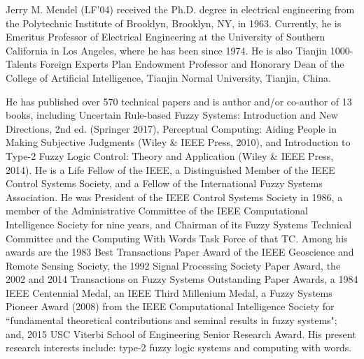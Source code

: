 \documentclass[journal,twocolumn]{IEEEtran}
\begin{document}
\begin{IEEEbiography}{Jerry M. Mendel} (LF'04) received the Ph.D. degree in electrical engineering from the Polytechnic Institute of Brooklyn, Brooklyn, NY, in 1963. Currently, he is Emeritus Professor of Electrical Engineering at the University of Southern California in Los Angeles,  where he has been since 1974. He is also Tianjin 1000-Talents Foreign Experts Plan Endowment Professor and Honorary Dean of the College of Artificial Intelligence, Tianjin Normal University, Tianjin, China.

He has published over 570 technical papers and is author and/or co-author of 13 books, including Uncertain Rule-based Fuzzy Systems: Introduction and New Directions, 2nd ed. (Springer 2017), Perceptual Computing: Aiding People in Making Subjective Judgments (Wiley \& IEEE Press, 2010), and Introduction to Type-2 Fuzzy Logic Control: Theory and Application (Wiley \& IEEE Press, 2014). He is a Life Fellow of the IEEE, a Distinguished Member of the IEEE Control Systems Society, and a Fellow of the International Fuzzy Systems Association. He was President of the IEEE Control Systems Society in 1986, a member of the Administrative Committee of the IEEE Computational Intelligence Society for nine years, and Chairman of its Fuzzy Systems Technical Committee and the Computing With Words Task Force of that TC. Among his awards are the 1983 Best Transactions Paper Award of the IEEE Geoscience and Remote Sensing Society, the 1992 Signal Processing Society Paper Award, the 2002 and 2014 Transactions on Fuzzy Systems Outstanding Paper Awards, a 1984 IEEE Centennial Medal, an IEEE Third Millenium Medal, a Fuzzy Systems Pioneer Award (2008) from the IEEE Computational Intelligence Society for ``fundamental theoretical contributions and seminal results in fuzzy systems"; and, 2015 USC Viterbi School of Engineering Senior Research Award. His present research interests include: type-2 fuzzy logic systems and computing with words.
\end{IEEEbiography}
\end{document}
